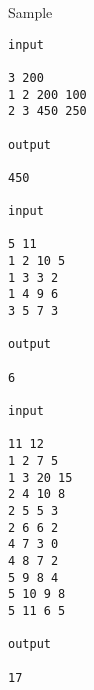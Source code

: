 Sample
\begin{verbatim}
input 
 
3 200 
1 2 200 100 
2 3 450 250 
 
output 
 
450

input 
 
5 11 
1 2 10 5 
1 3 3 2 
1 4 9 6 
3 5 7 3 
 
output 
 
6

input 
 
11 12 
1 2 7 5 
1 3 20 15 
2 4 10 8 
2 5 5 3 
2 6 6 2 
4 7 3 0 
4 8 7 2 
5 9 8 4 
5 10 9 8 
5 11 6 5 
 
output 
 
17\end{verbatim}

 